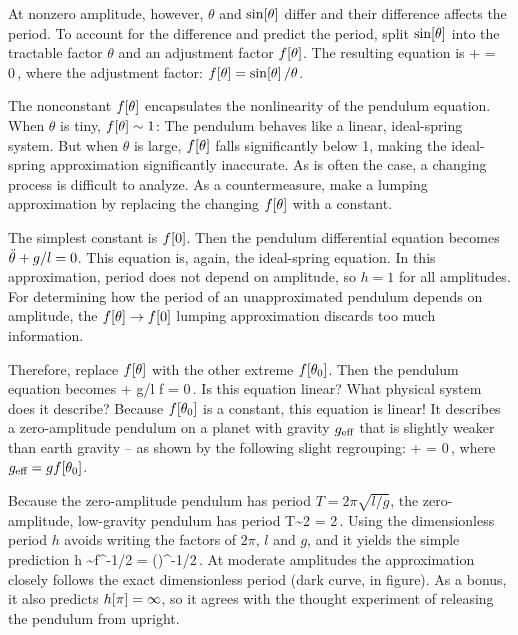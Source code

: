 At nonzero amplitude, however, $\theta$ and $\sin\!\left[{\theta}\right]$ differ and their difference affects the period. To account for the difference and predict the period, split $\sin\!\left[{\theta}\right]$ into the tractable factor $\theta$ and an adjustment factor $f\!\left[{\theta}\right]$. The resulting equation is
\beq
\ddt\theta + \theta\dfrac{\sin\vat\theta}{\theta} = 0\,,
\eeq
where the adjustment factor: $f\!\left[{\theta}\right] = \sin\!\left[{\theta}\right] / \theta$.

The nonconstant $f\!\left[{\theta}\right]$ encapsulates the nonlinearity of the pendulum equation. When $\theta$ is tiny, $f\!\left[{\theta}\right] \sim 1$: The pendulum behaves like a linear, ideal-spring system. But when $\theta$ is large, $f\!\left[{\theta}\right]$ falls significantly below 1, making the ideal-spring approximation significantly inaccurate. As is often the case, a changing process is difficult to analyze. As a countermeasure, make a lumping approximation by replacing the changing $f\!\left[{\theta}\right]$ with a constant.

The simplest constant is $f\!\left[{0}\right]$. Then the pendulum differential equation becomes $\ddot{\theta} + g/l = 0$. This equation is, again, the ideal-spring equation. In this approximation, period does not depend on amplitude, so $h = 1$ for all amplitudes. For determining how the period of an unapproximated pendulum depends on amplitude, the $f\!\left[{\theta}\right]\to f\!\left[{0}\right]$ lumping approximation discards too much information.

Therefore, replace $f\!\left[{\theta}\right]$ with the other extreme $f\!\left[{\theta_0}\right]$. Then the pendulum equation becomes
\beq
\ddt\theta + g/l\,\theta\,f = 0\,.
\eeq
Is this equation linear? What physical system does it describe? Because $f\!\left[{\theta_0}\right]$ is a constant, this equation is linear! It describes a zero-amplitude pendulum on a planet with gravity $g_\text{eff}$ that is slightly weaker than earth gravity -- as shown by the following slight regrouping:
\beq
\ddt\theta + \theta = 0\,,
\eeq
where $g_\text{eff} = gf\!\left[{\theta_0}\right]$.

Because the zero-amplitude pendulum has period $T = 2\pi\sqrt{l/g}$, the zero-amplitude, low-gravity pendulum has period
\beq
T\sim 2\pi{} 
                = 2\pi{}\,.
\eeq
Using the dimensionless period $h$ avoids writing the factors of $2\pi$, $l$ and $g$, and it yields the simple prediction
\beq
h \sim f^{-1/2} 
                = \left(\right)^{-1/2}\,.
\eeq
At moderate amplitudes the approximation closely follows the exact dimensionless period (dark curve, in figure). As a bonus, it also predicts $h\!\left[{\pi}\right] = \infty$, so it agrees with the thought experiment of releasing the pendulum from upright.

